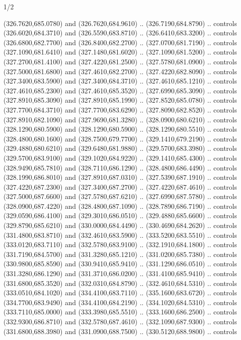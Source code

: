 \begin{flagdescription}{1/2}
\begin{scope}[xshift=0.5\flaglength]
\begin{scope}[scale=0.00745\flagwidth,xshift=-12.1mm,yshift=41.7mm]
\begin{scope}[y=0.80pt, x=0.80pt, yscale=-1, xscale=1, inner sep=0pt, outer sep=0pt]
\begin{scope}[cm={{1.33333,0.0,0.0,-1.33333,(0.0,114.66667)}}]
\begin{scope}[scale=0.100]
  (326.7620,685.0780) and (326.7620,684.9610) .. (326.7190,684.8790) .. controls
  (326.6020,684.3710) and (326.5590,683.8710) .. (326.6410,683.3200) .. controls
  (326.6800,682.7700) and (326.8400,682.2700) .. (327.0700,681.7190) .. controls
  (327.1090,681.6410) and (327.1480,681.6020) .. (327.1090,681.5200) .. controls
  (327.2700,681.4100) and (327.4220,681.2500) .. (327.5780,681.0900) .. controls
  (327.5000,681.6800) and (327.4610,682.2700) .. (327.4220,682.8090) .. controls
  (327.3400,683.5900) and (327.3400,684.3710) .. (327.4610,685.1210) .. controls
  (327.4610,685.2300) and (327.4610,685.3520) .. (327.6990,685.3090) .. controls
  (327.8910,685.3090) and (327.8910,685.1990) .. (327.8520,685.0780) .. controls
  (327.7700,684.3710) and (327.7700,683.6290) .. (327.8090,682.8520) .. controls
  (327.8910,682.1090) and (327.9690,681.3280) .. (328.0900,680.6210) .. controls
  (328.1290,680.5900) and (328.1290,680.5900) .. (328.1290,680.5510) .. controls
  (328.4800,680.1600) and (328.7500,679.7700) .. (329.1410,679.2190) .. controls
  (329.4880,680.6210) and (329.6480,681.9880) .. (329.5700,683.3980) .. controls
  (329.5700,683.9100) and (329.1020,684.9220) .. (329.1410,685.4300) .. controls
  (328.9490,685.7810) and (328.7110,686.1290) .. (328.4800,686.4490) .. controls
  (328.1990,686.8010) and (327.8910,687.0310) .. (327.5390,687.1910) .. controls
  (327.4220,687.2300) and (327.3400,687.2700) .. (327.4220,687.4610) .. controls
  (327.5000,687.6600) and (327.5780,687.6210) .. (327.6990,687.5780) .. controls
  (328.0900,687.4220) and (328.4800,687.1090) .. (328.7890,686.7190) .. controls
  (329.0590,686.4100) and (329.3010,686.0510) .. (329.4880,685.6600) .. controls
  (329.8790,685.6210) and (330.0000,684.4490) .. (330.4690,684.2620) .. controls
  (331.4800,683.8710) and (332.4610,683.5900) .. (333.5200,683.5510) .. controls
  (333.0120,683.7110) and (332.5780,683.9100) .. (332.1910,684.1800) .. controls
  (331.7190,684.5700) and (331.3280,685.1210) .. (331.0200,685.7380) .. controls
  (330.9800,685.8590) and (330.9410,685.9410) .. (331.1290,686.0510) .. controls
  (331.3280,686.1290) and (331.3710,686.0200) .. (331.4100,685.9410) .. controls
  (331.6800,685.3520) and (332.0310,684.8790) .. (332.4610,684.5310) .. controls
  (333.0510,684.1020) and (334.4100,683.7110) .. (335.1600,683.6720) .. controls
  (334.7700,683.9490) and (334.4100,684.2190) .. (334.1020,684.5310) .. controls
  (333.7110,685.0000) and (333.3980,685.5510) .. (333.1600,686.2500) .. controls
  (332.9300,686.8710) and (332.5780,687.4610) .. (332.1090,687.9300) .. controls
  (331.6800,688.3980) and (331.0900,688.7500) .. (330.5120,688.9800) .. controls

\end{scope}
\end{scope}
\end{scope}
\end{scope}
\end{scope}
\end{flagdescription}
